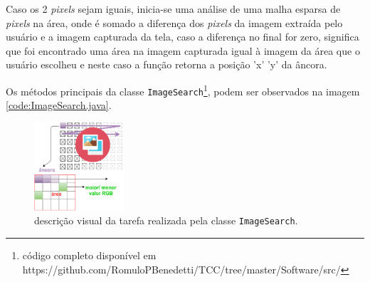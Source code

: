 \documentclass[tg]{mdtufsm}
\begin{document}
                Caso os 2 \emph{pixels} sejam iguais, inicia-se uma análise de uma malha esparsa de \emph{pixels} na área, onde é somado a diferença dos \emph{pixels} da imagem extraída pelo usuário e a imagem capturada da tela, caso a diferença no final for zero, significa que foi encontrado uma área na imagem capturada igual à imagem da área que o usuário escolheu e neste caso a função retorna a posição 'x' 'y' da âncora.

                Os métodos principais da classe \texttt{ImageSearch}\footnote{código completo disponível em https://github.com/RomuloPBenedetti/TCC/tree/master/Software/src/}, podem ser observados na imagem \ref{code:ImageSearch.java}.

                \begin{figure}[!htb]
                    {\centering
                    \includegraphics[width=0.3\textwidth]{imagens/searchImage.png}
                    \caption{descrição visual da tarefa realizada pela classe \texttt{ImageSearch}.}
                    \label{fig:ImageSearch}}
                \end{figure}
\end{document}
